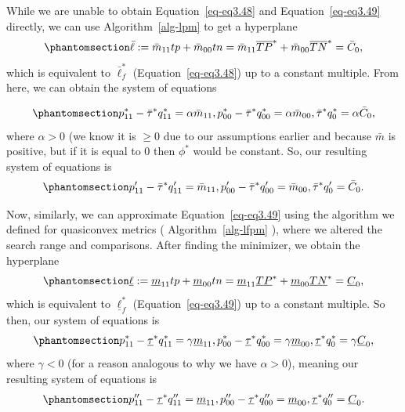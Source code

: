 \documentclass[
  letterpaper,
  numbers=noenddot,
  DIV=11]{scrreprt}
\theoremstyle{definition}
\theoremstyle{plain}
\theoremstyle{plain}
\theoremstyle{remark}
\begin{document}
While we are unable to obtain Equation~\ref{eq-eq3.48} and
Equation~\ref{eq-eq3.49} directly, we can use  Algorithm~\ref{alg-lpm} 
to get a hyperplane
\begin{equation}\phantomsection\label{eq-eq3.51}{\bar{\ell}:=\bar{m}_{11} t p+\bar{m}_{00} t n= \bar{m}_{11} \overline{T P}^{*}+\bar{m}_{00} \overline{T N}^{*} = \bar{C}_{0},}\end{equation}
which is equivalent to \(\bar{\ell}_{f}^{*}\) (Equation~\ref{eq-eq3.48})
up to a constant multiple. From here, we can obtain the system of
equations

\begin{equation}\phantomsection\label{eq-eq3.52}{p_{11}^{*}-\bar{\tau}^{*} q_{11}^{*}=\alpha \bar{m}_{11}, p_{00}^{*}-\bar{\tau}^{*} q_{00}^{*}=\alpha \bar{m}_{00}, \bar{\tau}^{*} q_{0}^{*}=\alpha \bar{C}_{0},}\end{equation}
where \(\alpha > 0\) (we know it is \(\geq0\) due to our assumptions
earlier and because \(\bar{m}\) is positive, but if it is equal to \(0\)
then \(\phi^*\) would be constant. So, our resulting system of equations
is \begin{equation}\phantomsection\label{eq-eq3.53}{\begin{aligned}
    p_{11}^{\prime}-\bar{\tau}^{*} q_{11}^{\prime}=\bar{m}_{11}, p_{00}^{\prime}-\bar{\tau}^{*} q_{00}^{\prime}=\bar{m}_{00}, \bar{\tau}^{*} q_{0}^{\prime}=\bar{C}_{0}.
\end{aligned}}\end{equation}

Now, similarly, we can approximate Equation~\ref{eq-eq3.49} using the
algorithm we defined for quasiconvex metrics
( Algorithm~\ref{alg-lfpm} ), where we altered the search range and
comparisons. After finding the minimizer, we obtain the hyperplane
\begin{equation}\phantomsection\label{eq-eq3.54}{\underline{\ell}:=\underline{m}_{11} t p+\underline{m}_{00} t n=\underline{m}_{11} \underline{TP}^{*}+\underline{m}_{00} \underline{TN}^{*} = \underline{C}_{0},}\end{equation}
which is equivalent to \(\underline{\ell}_{f}^{*}\)
(Equation~\ref{eq-eq3.49}) up to a constant multiple. So then, our
system of equations is
\begin{equation}\phantomsection\label{eq-eq3.55}{p_{11}^{*}-\underline{\tau}^{*} q_{11}^{*}=\gamma \underline{m}_{11}, p_{00}^{*}-\underline{\tau}^{*} q_{00}^{*}=\gamma \underline{m}_{00}, \underline{\tau}^{*} q_{0}^{*}=\gamma \underline{C}_{0},}\end{equation}
where \(\gamma <0\) (for a reason analogous to why we have
\(\alpha >0\)), meaning our resulting system of equations is
\begin{equation}\phantomsection\label{eq-eq3.56}{\begin{aligned}
    p_{11}^{\prime \prime}-\underline{\tau}^{*} q_{11}^{\prime \prime}=\underline{m}_{11}, p_{00}^{\prime \prime}-\underline{\tau}^{*} q_{00}^{\prime \prime}=\underline{m}_{00}, \underline{\tau}^{*} q_{0}^{\prime \prime}=\underline{C}_{0}.
\end{aligned}}\end{equation}
\end{document}
